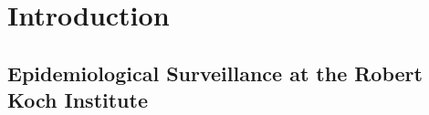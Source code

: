 \chapter{Introduction}
%
%
%


\section{Epidemiological Surveillance at the Robert Koch Institute}


